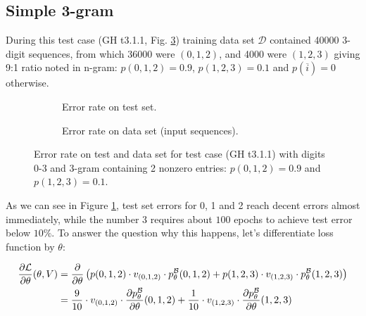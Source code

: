 \documentclass[declaration,shortabstract,lic,english]{iithesis}
\begin{document}
\subsection{Simple 3-gram}

During this test case (GH t3.1.1, Fig. \ref{fig:t311_errors}) training data set $\mathcal{D}$ contained 40000 3-digit sequences, from which 36000 were $(0, 1, 2)$, and 4000 were $(1, 2, 3)$ giving 9:1 ratio noted in n-gram: $p(0,1,2)=0.9$, $p(1, 2, 3)=0.1$ and $p(\overline{i})=0$ otherwise.

\begin{figure}[htb]
\begin{subfigure}[b]{.49\textwidth}
    \def\svgwidth{\textwidth}
    
    \caption{Error rate on test set.}
    \label{fig:t311_test_error}
\end{subfigure}
\begin{subfigure}[b]{.49\textwidth}
    \def\svgwidth{\textwidth}
    
    \caption{Error rate on data set (input sequences).}
    \label{fig:t311_data_error}
\end{subfigure}
\caption{Error rate on test and data set for test case (GH t3.1.1) with digits 0-3 and 3-gram containing 2 nonzero entries: $p(0,1,2)=0.9$ and $p(1, 2, 3)=0.1$.}
\label{fig:t311_errors}
\end{figure}

As we can see in Figure \ref{fig:t311_test_error}, test set errors for 0, 1 and 2 reach decent errors almost immediately, while the number 3 requires about $100$ epochs to achieve test error below $10\%$. To answer the question why this happens, let's differentiate loss function by $\theta$:

\newcommand{\sumxsinB}{\sum_{(x1, x2, x3)\in \mathcal{B}}}
\begin{align}
    \frac{\partial\mathcal{L}}{\partial \theta}(\theta, V) &= \frac{\partial}{\partial \theta} \left(p(0, 1, 2) \cdot v_{(0, 1, 2)} \cdot p_\theta^\mathcal{B}(0, 1, 2) + p(1, 2, 3)\cdot v_{(1, 2, 3)} \cdot p_\theta^\mathcal{B}(1, 2, 3)\right) \\
    &= \frac{9}{10} \cdot v_{(0, 1, 2)} \cdot \frac{\partial p_\theta^\mathcal{B}}{\partial \theta}(0, 1, 2) + \frac{1}{10}\cdot v_{(1, 2, 3)} \cdot \frac{\partial p_\theta^\mathcal{B}}{\partial \theta}(1, 2, 3)
\end{align}
\end{document}
